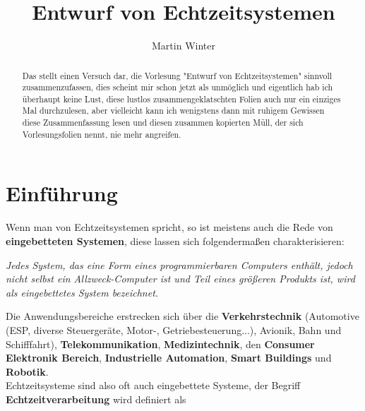 \documentclass[a4paper, 10 pt, conference]{ieeeconf}
\title{\LARGE \bf Entwurf von Echtzeitsystemen}
\author{Martin Winter}
\begin{document}
\maketitle
\thispagestyle{empty}
\pagestyle{empty}


\begin{abstract}

Das stellt einen Versuch dar, die Vorlesung "Entwurf von Echtzeitsystemen" sinnvoll zusammenzufassen, dies scheint mir schon jetzt als unmöglich und eigentlich hab ich überhaupt keine Lust, diese lustlos zusammengeklatschten Folien auch nur ein einziges Mal durchzulesen, aber vielleicht kann ich wenigstens dann mit ruhigem Gewissen diese Zusammenfassung lesen und diesen zusammen kopierten Müll, der sich Vorlesungsfolien nennt, nie mehr angreifen. \\

\end{abstract}



\section{\textbf{Einführung}}
Wenn man von Echtzeitsystemen spricht, so ist meistens auch die Rede von \textbf{eingebetteten Systemen}, diese lassen sich folgendermaßen charakterisieren:

\begin{center}
\textit{Jedes System, das eine Form eines programmierbaren Computers enthält, jedoch nicht selbst ein Allzweck-Computer ist und Teil eines größeren Produkts ist, wird als eingebettetes System bezeichnet.}
\end{center}

Die Anwendungsbereiche erstrecken sich über die \textbf{Verkehrstechnik} (Automotive (ESP, diverse Steuergeräte, Motor-, Getriebesteuerung...), Avionik, Bahn und Schifffahrt), \textbf{Telekommunikation}, \textbf{Medizintechnik}, den \textbf{Consumer Elektronik Bereich}, \textbf{Industrielle Automation}, \textbf{Smart Buildings} und \textbf{Robotik}.\\
Echtzeitsysteme sind also oft auch eingebettete Systeme, der Begriff \textbf{Echtzeitverarbeitung} wird definiert als
\end{document}
